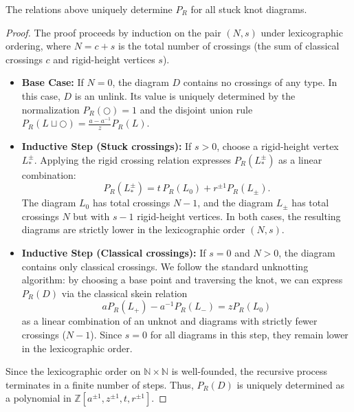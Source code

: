 \documentclass[10pt,a4paper]{amsart}
\begin{document}
\begin{proposition}
The relations above uniquely determine $P_R$ for all stuck knot diagrams.
\end{proposition}

\begin{proof}
The proof proceeds by induction on the pair $(N, s)$ under lexicographic ordering, where $N = c + s$ is the total number of crossings (the sum of classical crossings $c$ and rigid-height vertices $s$).

\begin{itemize}
    \item \textbf{Base Case:} If $N=0$, the diagram $D$ contains no crossings of any type. In this case, $D$ is an unlink. Its value is uniquely determined by the normalization $P_R(\bigcirc)=1$ and the disjoint union rule $P_R(L \sqcup \bigcirc) = \frac{a-a^{-1}}{z} P_R(L)$.

    \item \textbf{Inductive Step (Stuck crossings):} If $s > 0$, choose a rigid-height vertex $L_{\ast}^{\pm}$. Applying the rigid crossing relation expresses $P_R(L_{\ast}^{\pm})$ as a linear combination:
    \[
    P_R(L_{\ast}^{\pm}) = t\,P_R(L_0) + r^{\pm 1}P_R(L_{\pm}).
    \]
    The diagram $L_0$ has total crossings $N-1$, and the diagram $L_{\pm}$ has total crossings $N$ but with $s-1$ rigid-height vertices. In both cases, the resulting diagrams are strictly lower in the lexicographic order $(N, s)$.

    \item \textbf{Inductive Step (Classical crossings):} If $s = 0$ and $N > 0$, the diagram contains only classical crossings. We follow the standard unknotting algorithm: by choosing a base point and traversing the knot, we can express $P_R(D)$ via the classical skein relation 
    \[
    aP_R(L_+) - a^{-1}P_R(L_-) = zP_R(L_0)
    \]
    as a linear combination of an unknot and diagrams with strictly fewer crossings ($N-1$). Since $s=0$ for all diagrams in this step, they remain lower in the lexicographic order.
\end{itemize}

Since the lexicographic order on $\mathbb{N} \times \mathbb{N}$ is well-founded, the recursive process terminates in a finite number of steps. Thus, $P_R(D)$ is uniquely determined as a polynomial in $\mathbb{Z}[a^{\pm 1}, z^{\pm 1}, t, r^{\pm 1}]$.
\end{proof}
\end{document}
